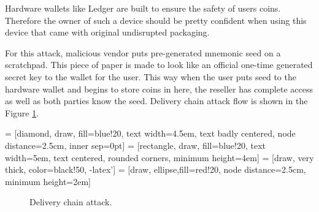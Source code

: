 \documentclass[
  printed, %
  table,   %
  lof,     %
  lot,     %
           oneside, color
]{fithesis3}
\begin{document}
Hardware wallets like Ledger are built to ensure the safety of users coins. Therefore the owner of such a device should be pretty confident when using this device that came with original undisrupted packaging. 

For this attack, malicious vendor puts pre-generated mnemonic seed on a scratchpad. This piece of paper is made to look like an official one-time generated secret key to the wallet for the user. This way when the user puts seed to the hardware wallet and begins to store coins in here, the reseller has complete access as well as both parties know the seed. Delivery chain attack flow is shown in the Figure \ref{pict:delivery-chain-attack}.

 = [diamond, draw, fill=blue!20,
    text width=4.5em, text badly centered, node distance=2.5cm, inner sep=0pt]
 = [rectangle, draw, fill=blue!20,
    text width=5em, text centered, rounded corners, minimum height=4em]
 = [draw, very thick, color=black!50, -latex']
 = [draw, ellipse,fill=red!20, node distance=2.5cm,
    minimum height=2em]
\begin{figure}[H]
\center
{}
\caption{Delivery chain attack.}
\label{pict:delivery-chain-attack}
\end{figure}
\end{document}
